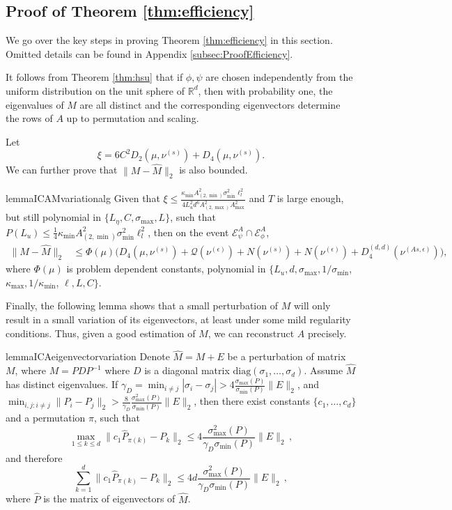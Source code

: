 \documentclass[11pt]{article}
\newcommand{\EA}[1]{\mathcal{E}^A_{#1}}
\newcommand{\Epsi}{\EA{\psi}}
\newcommand{\Ephi}{\EA{\phi}}
\newcommand{\real}{\mathbb{R}}
\newcommand{\cQ}{\mathcal{Q}}
\newcommand{\eps}{\epsilon}
\begin{document}
\subsection{Proof of Theorem \ref{thm:efficiency}}
\label{subsec:ICAproofefficiency}
We go over the key steps in proving Theorem \ref{thm:efficiency} in this section. Omitted details can be found in Appendix \ref{subsec:ProofEfficiency}.

It follows from Theorem \ref{thm:hsu} that 
if $\phi,\psi$ are chosen independently from the uniform distribution on the unit sphere of $\real^d$, then with probability one,
the eigenvalues of  $M$ are all distinct and the corresponding eigenvectors
determine the rows of $A$ up to permutation and scaling. 

Let 
\begin{equation}
\label{eq:xi}
\xi = 6C^2D_2(\mu, \nu^{(s)}) + D_4(\mu, \nu^{(s)}).
\end{equation}
We can further prove that $\|M - \hat{M}\|_2$ is also bounded.
\begin{restatable}{lemma}{ICAMvariationalg}
	\label{lem:Mvariation_alg}
	Given that  $\xi \le  \frac{\kappa_{\min}A^2_{(2,\min)}\sigma_{\min}^2\ell_l^2}{4L_u^2d^6 A_{(2,\max)}^2A_{\max}^2}$ and $T$  is large enough, but still polynomial in $\{L_\eta, C, \sigma_{\max}, L\}$, such that $P(L_u) \le \frac{1}{4}\kappa_{\min}A^2_{(2,\min)}\sigma_{\min}^2\ell_l^2$, then on the event $\Epsi\cap\Ephi$, 
	\begin{align*}
	\|M - \hat{M}\|_2 & \le \Phi(\mu)\Big( D_4(\mu, \nu^{(s)} )+ \cQ(\nu^{(\epsilon)}) + N(\nu^{(s)}) + N(\nu^{(\eps)})+ D_4^{(d,d)}(\nu^{(As,\eps)}) \Big),
	\end{align*}
	where $\Phi(\mu)$ is problem dependent constants, polynomial in
	$\{L_u, d, \sigma_{\max}, 1/\sigma_{\min}$, $\kappa_{\max}, 1/\kappa_{\min}$, $ \ell, L ,C\}$.
\end{restatable}
Finally, the following lemma shows that a small perturbation of $M$ will only result in a small variation of its eigenvectors, at least under some mild regularity conditions.
Thus, given a good estimation of $M$, we can reconstruct $A$ precisely.
\begin{restatable}{lemma}{ICAeigenvectorvariation}
	\label{lem:eigenvectorvariation} 
	Denote $\hat{M} = M+E$ be a perturbation of matrix $M$, where $M = PDP^{-1}$ where $D$ is a diagonal matrix $\text{diag}(\sigma_1,\ldots, \sigma_d)$.
	Assume $\hat{M}$ has distinct eigenvalues. 
	If $\gamma_D  = \min_{i\neq j} |\sigma_i - \sigma_j|> 4 \frac{\sigma_{\max}(P)}{\sigma_{\min}(P)}\|E\|_2$, and $\min_{i,j:i\neq j} \|P_i - P_j\|_2 > \frac{8}{\gamma_D}\frac{\sigma_{\max}^2(P)}{\sigma_{\min}(P) } \|E\|_2$, then there exist constants $\{c_1,\ldots,c_d\}$ and a permutation $\pi$, such that 
	\[
	\max_{1\le k\le d} \| c_1\hat{P}_{\pi(k)} - P_k\|_2 \le 4  \frac{\sigma_{\max}^2(P)}{\gamma_D \sigma_{\min} (P)} \|E\|_2\,,
	\]
	and therefore
	\[
	\sum_{k=1}^{d}\| c_1\hat{P}_{\pi(k)} - P_k\|_2 \le 4d  \frac{\sigma_{\max}^2(P)}{\gamma_D \sigma_{\min}(P)} \|E\|_2\,,
	\]
	where $\hat{P}$ is the matrix of eigenvectors of $\hat{M}$. 
\end{restatable}
\end{document}
